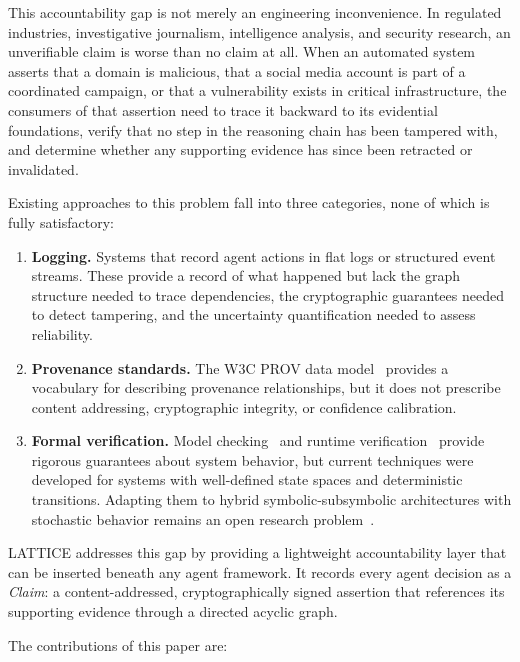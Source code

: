 \documentclass[11pt,twocolumn]{article}
\begin{document}
This accountability gap is not merely an engineering inconvenience. In regulated industries, investigative journalism, intelligence analysis, and security research, an unverifiable claim is worse than no claim at all. When an automated system asserts that a domain is malicious, that a social media account is part of a coordinated campaign, or that a vulnerability exists in critical infrastructure, the consumers of that assertion need to trace it backward to its evidential foundations, verify that no step in the reasoning chain has been tampered with, and determine whether any supporting evidence has since been retracted or invalidated.

Existing approaches to this problem fall into three categories, none of which is fully satisfactory:

\begin{enumerate}[leftmargin=*,itemsep=2pt]
\item \textbf{Logging.} Systems that record agent actions in flat logs or structured event streams. These provide a record of what happened but lack the graph structure needed to trace dependencies, the cryptographic guarantees needed to detect tampering, and the uncertainty quantification needed to assess reliability.

\item \textbf{Provenance standards.} The W3C PROV data model~\cite{moreau2013prov} provides a vocabulary for describing provenance relationships, but it does not prescribe content addressing, cryptographic integrity, or confidence calibration.

\item \textbf{Formal verification.} Model checking~\cite{clarke1999model} and runtime verification~\cite{leucker2009brief} provide rigorous guarantees about system behavior, but current techniques were developed for systems with well-defined state spaces and deterministic transitions. Adapting them to hybrid symbolic-subsymbolic architectures with stochastic behavior remains an open research problem~\cite{ferrando2021holistic}.
\end{enumerate}

LATTICE addresses this gap by providing a lightweight accountability layer that can be inserted beneath any agent framework. It records every agent decision as a \textit{Claim}: a content-addressed, cryptographically signed assertion that references its supporting evidence through a directed acyclic graph.

The contributions of this paper are:
\end{document}
